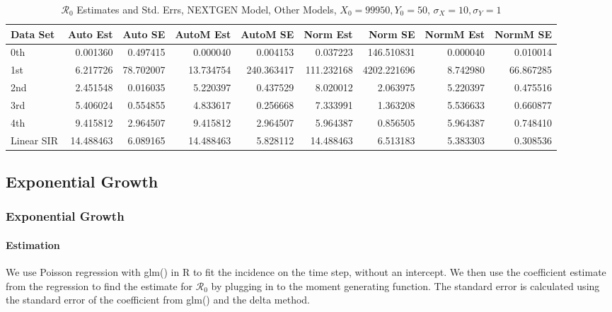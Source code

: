 \documentclass[12pt]{article}
\newcommand{\rr}{\ensuremath{\mathcal{R}_0}}
\begin{document}
\begin{table}[H]
	
	\caption{$\rr$ Estimates and Std. Errs, NEXTGEN Model,
		Other Models, $X_0 = 99950, Y_0 = 50$, 
		$\sigma_X = 10, \sigma_Y = 1$}
	\begin{footnotesize}
		\hskip -1cm
		\begin{tabular}{l|r|r|r|r|r|r|r|r}
			\hline
			Data Set & Auto Est & Auto SE & AutoM Est & AutoM SE & Norm Est & Norm SE & NormM Est & NormM SE\\
			\hline
			0th & 0.001360 & 0.497415 & 0.000040 & 0.004153 & 0.037223 & 146.510831 & 0.000040 & 0.010014\\
			\hline
			1st & 6.217726 & 78.702007 & 13.734754 & 240.363417 & 111.232168 & 4202.221696 & 8.742980 & 66.867285\\
			\hline
			2nd & 2.451548 & 0.016035 & 5.220397 & 0.437529 & 8.020012 & 2.063975 & 5.220397 & 0.475516\\
			\hline
			3rd & 5.406024 & 0.554855 & 4.833617 & 0.256668 & 7.333991 & 1.363208 & 5.536633 & 0.660877\\
			\hline
			4th & 9.415812 & 2.964507 & 9.415812 & 2.964507 & 5.964387 & 0.856505 & 5.964387 & 0.748410\\
			\hline
			Linear SIR & 14.488463 & 6.089165 & 14.488463 & 5.828112 & 14.488463 & 6.513183 & 5.383303 & 0.308536\\
			\hline
		\end{tabular}
	\end{footnotesize}
\end{table}

\subsection{Exponential Growth}

\subsubsection{Exponential Growth}

\paragraph{Estimation}

We use Poisson regression with glm() in R to fit the incidence on the time step, without an intercept. We then use the coefficient estimate from the regression to find the estimate for $\rr$ by plugging in to the moment generating function. The standard error is calculated using the standard error of the coefficient from glm() and the delta method.
\end{document}
